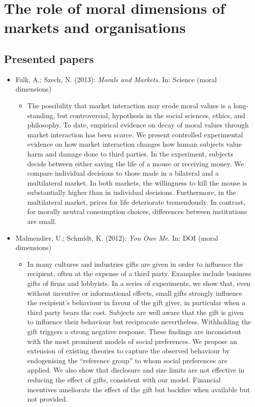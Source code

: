 

\section{The role of moral dimensions of markets and organisations}

\subsection{Presented papers}

\begin{itemize}
	\item Falk, A.; Szech, N. (2013): \textit{Morals and Markets}. In: Science (moral dimensions)
		\begin{itemize}
			\item The possibility that market interaction may erode moral values is a long-standing, but controversial, hypothesis in the social sciences, ethics, and philosophy. To date, empirical evidence on decay of moral values through market interaction has been scarce. We present controlled experimental evidence on how market interaction changes how human subjects value harm and damage done to third parties. In the experiment, subjects decide between either saving the life of a mouse or receiving money. We compare individual decisions to those made in a bilateral and a multilateral market. In both markets, the willingness to kill the mouse is substantially higher than in individual decisions. Furthermore, in the multilateral market, prices for life deteriorate tremendously. In contrast, for morally neutral consumption choices, differences between institutions are small.
		\end{itemize}
	\item Malmendier, U.; Schmidt, K. (2012): \textit{You Owe Me}. In: DOI (moral dimensions)
		\begin{itemize}
			\item In many cultures and industries gifts are given in order to influence the recipient, often at the expense of a third party. Examples include business gifts of firms and lobbyists. In a series of experiments, we show that, even without incentive or informational effects, small gifts strongly influence the recipient’s behaviour in favour of the gift giver, in particular when a third party bears the cost. Subjects are well aware that the gift is given to influence their behaviour but reciprocate nevertheless. Withholding the gift triggers a strong negative response. These findings are inconsistent with the most prominent models of social preferences. We propose an extension of existing theories to capture the observed behaviour by endogenising the “reference group” to whom social preferences are applied. We also show that disclosure and size limits are not effective in reducing the effect of gifts, consistent with our model. Financial incentives ameliorate the effect of the gift but backfire when available but not provided.

\end{itemize}
\end{itemize}
